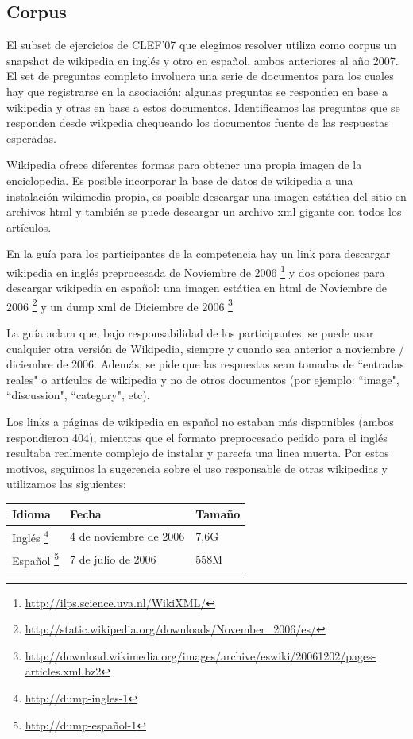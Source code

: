 \subsection{Corpus}
El subset de ejercicios de CLEF'07 que elegimos resolver
utiliza como corpus un snapshot de wikipedia en inglés y otro en español,
ambos anteriores al año 2007.
El set de preguntas completo involucra una serie de documentos para los cuales hay que 
registrarse en la asociación: algunas preguntas se responden en base a wikipedia y otras en base a estos documentos.
Identificamos las preguntas que se responden desde wikpedia chequeando los documentos fuente de las respuestas esperadas.

Wikipedia ofrece diferentes formas para obtener una propia imagen de la enciclopedia.
Es posible incorporar la base de datos de wikipedia a una instalación wikimedia
propia, es posible descargar una imagen estática del sitio en archivos html y también se puede
descargar un archivo xml gigante con todos los artículos. 

En la guía para los participantes de la competencia \cite{GuidelineClef07} hay un link para descargar 
wikipedia en inglés preprocesada de Noviembre de 2006 \footnote{\url{http://ilps.science.uva.nl/WikiXML/}} y dos opciones para descargar wikipedia en español: una imagen estática en html de Noviembre de 2006 \footnote{\url{http://static.wikipedia.org/downloads/November_2006/es/}} y un dump xml de Diciembre de 2006 
\footnote{\url{http://download.wikimedia.org/images/archive/eswiki/20061202/pages-articles.xml.bz2}}

La guía aclara que, bajo responsabilidad de los participantes, se puede usar
cualquier otra versión de Wikipedia, siempre y cuando sea anterior a noviembre / diciembre de 2006.
Además, se pide que las respuestas sean tomadas de ``entradas reales" o artículos de wikipedia y
no de otros documentos (por ejemplo: ``image", ``discussion", ``category", etc).

Los links a páginas de wikipedia en español no estaban más disponibles (ambos respondieron 404), mientras que el formato
preprocesado pedido para el inglés resultaba realmente complejo de instalar y parecía una linea muerta. Por estos motivos,
seguimos la sugerencia sobre el uso responsable de otras wikipedias y utilizamos las siguientes:

\medskip

\begin{center}
\begin{tabular}{ | l | l | l |}
    \hline
    Idioma & Fecha & Tamaño\\ \hline
    Inglés \footnote{\url{http://dump-ingles-1}} & 4 de noviembre de 2006 & 7,6G \\ \hline
    Español \footnote{\url{http://dump-español-1}} & 7 de julio de 2006 & 558M \\ \hline
\end{tabular}  
\end{center}

